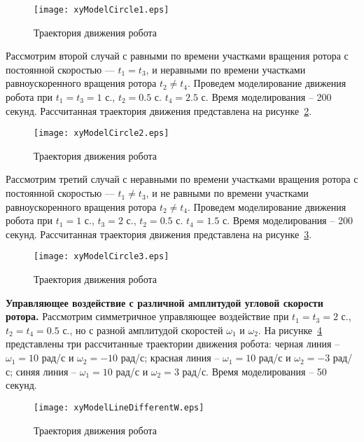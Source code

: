 \begin{figure}[!ht]
	\centering
	\texttt{[image: xyModelCircle1.eps]}
	\caption{Траектория движения робота}
	\label{xyModelCircle1}
\end{figure}

Рассмотрим второй случай с равными по времени участками вращения ротора с постоянной скоростью --- $t_1 = t_3$, и неравными по времени участками равноускоренного вращения ротора $t_2 \neq t_4$. Проведем моделирование движения робота при $t_1=t_3=1$ с., $t_2=0.5$ с. $t_4 = 2.5$ с. Время моделирования -- 200 секунд. Рассчитанная траектория движения представлена на рисунке~\ref{xyModelCircle2}.

\begin{figure}[!ht]
	\centering
	\texttt{[image: xyModelCircle2.eps]}
	\caption{Траектория движения робота}
	\label{xyModelCircle2}
\end{figure}

Рассмотрим третий случай с неравными по времени участками вращения ротора с постоянной скоростью --- $t_1 \neq t_3$, и не равными по времени участками равноускоренного вращения ротора $t_2 \neq t_4$. Проведем моделирование движения робота при $t_1=1$ с., $t_3=2$ с., $t_2=0.5$ с. $t_4 = 1.5$ с. Время моделирования -- 200 секунд. Рассчитанная траектория движения представлена на рисунке~\ref{xyModelCircle3}.

\begin{figure}[!ht]
	\centering
	\texttt{[image: xyModelCircle3.eps]}
	\caption{Траектория движения робота}
	\label{xyModelCircle3}
\end{figure}

\textbf{Управляющее воздействие с различной амплитудой угловой скорости ротора.} Рассмотрим симметричное управляющее воздействие при $t_1=t_3=2$ с., $t_2=t_4 = 0.5$ с., но с разной амплитудой скоростей $\omega_1$ и $\omega_2$.  На рисунке~\ref{xyModelLineDifferentW} представлены три рассчитанные траектории движения робота: черная линия -- $\omega_1=10$ рад/с и $\omega_2=-10$ рад/с; красная линия -- $\omega_1=10$ рад/с и $\omega_2=-3$ рад/с; синяя линия -- $\omega_1=10$ рад/с и $\omega_2=3$ рад/с. Время моделирования -- 50 секунд.

\begin{figure}[!ht]
	\centering
	\texttt{[image: xyModelLineDifferentW.eps]}
	\caption{Траектория движения робота}
	\label{xyModelLineDifferentW}
\end{figure}

